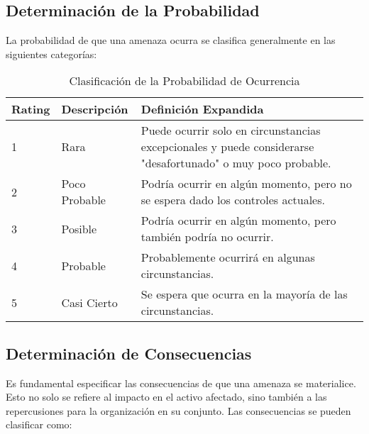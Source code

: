 \subsection{Determinación de la Probabilidad}
La probabilidad de que una amenaza ocurra se clasifica generalmente en las siguientes categorías:

\begin{table}[h]
    \centering
    \caption{Clasificación de la Probabilidad de Ocurrencia}
    \begin{tabularx}{\textwidth}{@{}XXX@{}}
        \toprule
        \textbf{Rating} & \textbf{Descripción} & \textbf{Definición Expandida} \\ \midrule
        1 & Rara & Puede ocurrir solo en circunstancias excepcionales y puede considerarse "desafortunado" o muy poco probable. \\
        2 & Poco Probable & Podría ocurrir en algún momento, pero no se espera dado los controles actuales. \\
        3 & Posible & Podría ocurrir en algún momento, pero también podría no ocurrir. \\
        4 & Probable & Probablemente ocurrirá en algunas circunstancias. \\
        5 & Casi Cierto & Se espera que ocurra en la mayoría de las circunstancias. \\ \bottomrule
    \end{tabularx}
\end{table}

\subsection{Determinación de Consecuencias}
Es fundamental especificar las consecuencias de que una amenaza se materialice. Esto no solo se refiere al impacto en el activo afectado, sino también a las repercusiones para la organización en su conjunto. Las consecuencias se pueden clasificar como:

